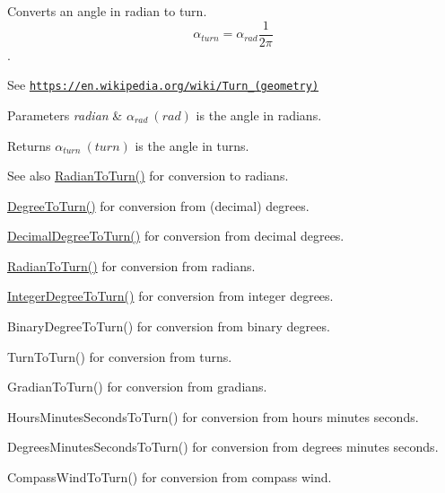 Converts an angle in radian to turn. \[\alpha_{turn}=\alpha_{rad}\frac{1}{2 \pi}\]. 

See \href{https://en.wikipedia.org/wiki/Turn_(geometry)}{\tt https\+://en.\+wikipedia.\+org/wiki/\+Turn\+\_\+(geometry)} 
\begin{DoxyParams}{Parameters}
{\em radian} & $\alpha_{rad}\ (rad)$ is the angle in radians. \\
\hline
\end{DoxyParams}
\begin{DoxyReturn}{Returns}
$\alpha_{turn}\ (turn)$ is the angle in turns. 
\end{DoxyReturn}
\begin{DoxySeeAlso}{See also}
\mbox{\hyperlink{group___e_g_x_math-_angle_conversions-_radian_ga8492d6d2f6467c619b65e5fb75a9ae04}{Radian\+To\+Turn()}} for conversion to radians. 

\mbox{\hyperlink{group___e_g_x_math-_angle_conversions-_degree_gafb4ce930493a7d6202ede3ee1630ef5d}{Degree\+To\+Turn()}} for conversion from (decimal) degrees. 

\mbox{\hyperlink{group___e_g_x_math-_angle_conversions-_decimal_degree_ga396a13c10acdef5026c12f3217b142c1}{Decimal\+Degree\+To\+Turn()}} for conversion from decimal degrees. 

\mbox{\hyperlink{group___e_g_x_math-_angle_conversions-_radian_ga8492d6d2f6467c619b65e5fb75a9ae04}{Radian\+To\+Turn()}} for conversion from radians. 

\mbox{\hyperlink{group___e_g_x_math-_angle_conversions-_integer_degree_ga06ddbdada5a3978105c855d4aae735ae}{Integer\+Degree\+To\+Turn()}} for conversion from integer degrees. 

Binary\+Degree\+To\+Turn() for conversion from binary degrees. 

Turn\+To\+Turn() for conversion from turns. 

Gradian\+To\+Turn() for conversion from gradians. 

Hours\+Minutes\+Seconds\+To\+Turn() for conversion from hours minutes seconds. 

Degrees\+Minutes\+Seconds\+To\+Turn() for conversion from degrees minutes seconds. 

Compass\+Wind\+To\+Turn() for conversion from compass wind. 
\end{DoxySeeAlso}
